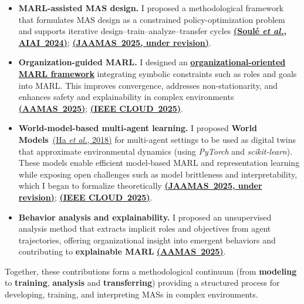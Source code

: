 \documentclass[11pt,a4paper,sans]{moderncv}
\begin{document}
\begin{itemize}
      \item \textbf{MARL-assisted MAS design.}
            I proposed a methodological framework that formulates MAS design as a constrained policy-optimization problem and supports iterative design--train--analyze--transfer cycles \href{https://link.springer.com/chapter/10.1007/978-3-031-63223-5_24}{\textbf{(Soulé \textit{et al.}, AIAI~2024)}}; \href{https://sciety-labs.elifesciences.org/articles/by?article_doi=10.21203/rs.3.rs-7166037/v1}{\textbf{(JAAMAS~2025, under revision)}}.

      \item \textbf{Organization-guided MARL.}
            I designed an \href{https://github.com/julien6/MOISE-MARL}{\textbf{organizational-oriented MARL framework}} integrating symbolic constraints such as roles and goals into MARL.
            This improves convergence, addresses non-stationarity, and enhances safety and explainability in complex environments \href{https://arxiv.org/abs/2503.23615}{\textbf{(AAMAS~2025)}}; \href{https://arxiv.org/abs/2505.21559}{\textbf{(IEEE CLOUD~2025)}}.

      \item \textbf{World-model-based multi-agent learning.}
            I proposed \textbf{World Models}~\href{https://link.springer.com/chapter/10.1007/978-3-031-63223-5_24}{(Ha \textit{et al.}, 2018)} for multi-agent settings to be used as digital twins that approximate environmental dynamics (using \textit{PyTorch} and \textit{scikit-learn}).
            These models enable efficient model-based MARL and representation learning while exposing open challenges such as model brittleness and interpretability, which I began to formalize theoretically \href{https://sciety-labs.elifesciences.org/articles/by?article_doi=10.21203/rs.3.rs-7166037/v1}{\textbf{(JAAMAS~2025, under revision)}}; \href{https://arxiv.org/abs/2505.21559}{\textbf{(IEEE CLOUD~2025)}}.

      \item \textbf{Behavior analysis and explainability.}
            I proposed an unsupervised analysis method that extracts implicit roles and objectives from agent trajectories, offering organizational insight into emergent behaviors and contributing to \textbf{explainable MARL} \href{https://arxiv.org/abs/2503.23615}{\textbf{(AAMAS~2025)}}.
\end{itemize}

Together, these contributions form a methodological continuum (from \textbf{modeling} to \textbf{training}, \textbf{analysis} and \textbf{transferring}) providing a structured process for developing, training, and interpreting MASs in complex environments.
\end{document}
